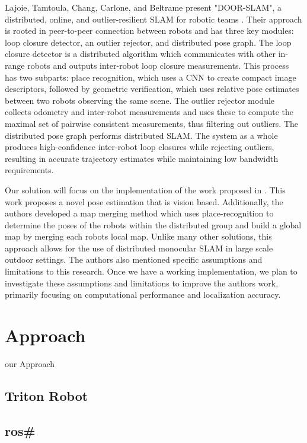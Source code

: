 \documentclass[conference]{IEEEtran}
\begin{document}
Lajoie, Tamtoula, Chang, Carlone, and Beltrame present "DOOR-SLAM", a distributed, online, and outlier-resilient SLAM for robotic teams \cite{Lajoie2020DOORSLAM}. Their approach is rooted in peer-to-peer connection between robots and has three key modules: loop closure detector, an outlier rejector, and distributed pose graph. The loop closure detector is a distributed algorithm which communicates with other in-range robots and outputs inter-robot loop closure measurements. This process has two subparts: place recognition, which uses a CNN to create compact image descriptors, followed by geometric verification, which uses relative pose estimates between two robots observing the same scene.  The outlier rejector module collects odometry and inter-robot measurements and uses these to compute the maximal set of pairwise consistent measurements, thus filtering out outliers. The distributed pose graph performs distributed SLAM. The system as a whole produces high-confidence inter-robot loop closures while rejecting outliers, resulting in accurate trajectory estimates while maintaining low bandwidth requirements.

Our solution will focus on the implementation of the work proposed in \cite{monocular}. This work proposes a novel pose estimation that is vision based. Additionally, the authors developed a map merging method which uses place-recognition to determine the poses of the robots within the distributed group and build a global map by merging each robots local map. Unlike many other solutions, this approach allows for the use of distributed monocular SLAM in large scale outdoor settings. The authors also mentioned specific assumptions and limitations to this research. Once we have a working implementation, we plan to investigate these assumptions and limitations to improve the authors work, primarily focusing on computational performance and localization accuracy.


\section{Approach}
our Approach
\subsection{Triton Robot}
\subsection{ros\#}
\end{document}
